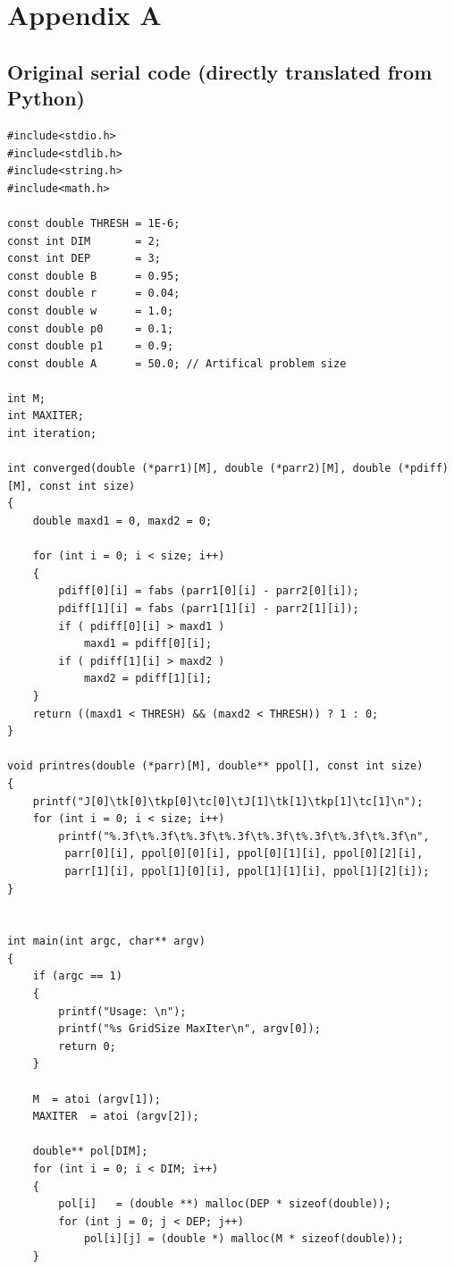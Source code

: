 \documentclass[12pt]{article}
\begin{document}
\newpage
\section*{Appendix A}
\subsection*{Original serial code (directly translated from Python)}

\begin{lstlisting}[caption=Original serial code, label={lst:LAppendix}]
#include<stdio.h>
#include<stdlib.h>
#include<string.h>
#include<math.h>
 
const double THRESH = 1E-6;
const int DIM       = 2;
const int DEP       = 3;
const double B      = 0.95;
const double r      = 0.04;         
const double w      = 1.0;  
const double p0     = 0.1;  
const double p1     = 0.9;
const double A      = 50.0; // Artifical problem size
 
int M;
int MAXITER;
int iteration;
 
int converged(double (*parr1)[M], double (*parr2)[M], double (*pdiff)[M], const int size)
{
    double maxd1 = 0, maxd2 = 0;
 
    for (int i = 0; i < size; i++)
    {
        pdiff[0][i] = fabs (parr1[0][i] - parr2[0][i]);
        pdiff[1][i] = fabs (parr1[1][i] - parr2[1][i]);
        if ( pdiff[0][i] > maxd1 )
            maxd1 = pdiff[0][i];
        if ( pdiff[1][i] > maxd2 )
            maxd2 = pdiff[1][i];
    }
    return ((maxd1 < THRESH) && (maxd2 < THRESH)) ? 1 : 0; 
}
 
void printres(double (*parr)[M], double** ppol[], const int size)
{
    printf("J[0]\tk[0]\tkp[0]\tc[0]\tJ[1]\tk[1]\tkp[1]\tc[1]\n");
    for (int i = 0; i < size; i++)
        printf("%.3f\t%.3f\t%.3f\t%.3f\t%.3f\t%.3f\t%.3f\t%.3f\n",
         parr[0][i], ppol[0][0][i], ppol[0][1][i], ppol[0][2][i], 
         parr[1][i], ppol[1][0][i], ppol[1][1][i], ppol[1][2][i]);
}
 
 
int main(int argc, char** argv)
{
    if (argc == 1) 
    {
        printf("Usage: \n");
        printf("%s GridSize MaxIter\n", argv[0]);
        return 0;
    }
     
    M  = atoi (argv[1]);
    MAXITER  = atoi (argv[2]);
 
    double** pol[DIM];
    for (int i = 0; i < DIM; i++)
    {
        pol[i]   = (double **) malloc(DEP * sizeof(double));
        for (int j = 0; j < DEP; j++)
            pol[i][j] = (double *) malloc(M * sizeof(double));
    }
 

\end{lstlisting}
\end{document}
